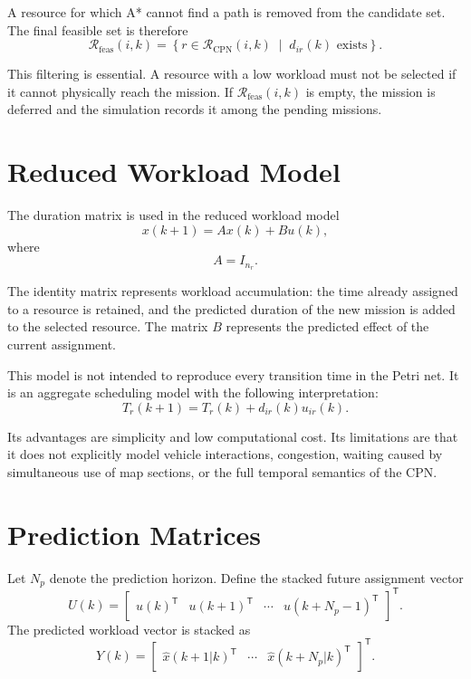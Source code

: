 A resource for which A* cannot find a path is removed from the candidate set.
The final feasible set is therefore
\begin{equation}
	\mathcal{R}_{\mathrm{feas}}(i,k) =
	\left\{r \in \mathcal{R}_{\mathrm{CPN}}(i,k) \;\middle|\;
	d_{ir}(k) \text{ exists}
	\right\}.
\end{equation}

This filtering is essential. A resource with a low workload must not be
selected if it cannot physically reach the mission. If
$\mathcal{R}_{\mathrm{feas}}(i,k)$ is empty, the mission is deferred and the
simulation records it among the pending missions.

\section{Reduced Workload Model}

The duration matrix is used in the reduced workload model
\begin{equation}
	x(k+1) = A x(k) + B u(k),
\end{equation}
where
\begin{equation}
	A = I_{n_r}.
\end{equation}

The identity matrix represents workload accumulation: the time already
assigned to a resource is retained, and the predicted duration of the new
mission is added to the selected resource. The matrix $B$ represents the
predicted effect of the current assignment.

This model is not intended to reproduce every transition time in the Petri
net. It is an aggregate scheduling model with the following interpretation:
\begin{equation}
	T_r(k+1) = T_r(k) + d_{ir}(k)u_{ir}(k).
\end{equation}

Its advantages are simplicity and low computational cost. Its limitations
are that it does not explicitly model vehicle interactions, congestion,
waiting caused by simultaneous use of map sections, or the full temporal
semantics of the CPN.

\section{Prediction Matrices}

Let $N_p$ denote the prediction horizon. Define the stacked future assignment
vector
\begin{equation}
	U(k) =
	\begin{bmatrix}
		u(k)^{\mathsf{T}} & u(k+1)^{\mathsf{T}} & \cdots &
		u(k+N_p-1)^{\mathsf{T}}
	\end{bmatrix}^{\mathsf{T}}.
\end{equation}
The predicted workload vector is stacked as
\begin{equation}
	Y(k) =
	\begin{bmatrix}
		\hat{x}(k+1|k)^{\mathsf{T}} & \cdots &
		\hat{x}(k+N_p|k)^{\mathsf{T}}
	\end{bmatrix}^{\mathsf{T}}.
\end{equation}

